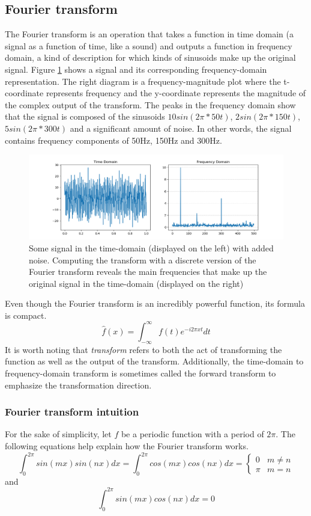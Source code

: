 \subsection{Fourier transform} 
The Fourier transform is an operation that takes a function in time domain (a signal as a function of time, like a sound) and outputs a function in frequency domain, a kind of description for which kinds of sinusoids make up the original signal. Figure \ref{fig:transform} shows a signal and its corresponding frequency-domain representation. The right diagram is a frequency-magnitude plot where the t-coordinate represents frequency and the y-coordinate represents the magnitude of the complex output of the transform. The peaks in the frequency domain show that the signal is composed of the sinusoids $10sin(2\pi * 50t)$, $2sin(2\pi * 150t)$, $5sin(2\pi * 300t)$ and a significant amount of noise. In other words, the signal contains frequency components of 50Hz, 150Hz and 300Hz. 

\begin{figure}[ht]
    \centering
    \includegraphics[width=\textwidth]{./images/transform.png}
    \caption{Some signal in the time-domain (displayed on the left) with added noise. Computing the transform with a discrete version of the Fourier transform reveals the main frequencies that make up the original signal in the time-domain (displayed on the right)\label{fig:transform}}
\end{figure}

Even though the Fourier transform is an incredibly powerful function, its formula is compact. 
$$\hat{f}(x) = \int_{-\infty}^{\infty} f(t)e^{-i2\pi x t} dt$$
It is worth noting that \textit{transform} refers to both the act of transforming the function as well as the output of the transform. Additionally, the time-domain to frequency-domain transform is sometimes called the forward transform to emphasize the transformation direction. 

\subsubsection{Fourier transform intuition}
For the sake of simplicity, let $f$ be a periodic function with a period of $2\pi$. The following equations help explain how the Fourier transform works.
\[ \int_0^{2\pi} sin(mx)sin(nx)dx = \int_0^{2\pi} cos(mx)cos(nx)dx= 
\begin{cases} %
    0 & m\neq n \\
    \pi & m=n
\end{cases} 
\]
\noindent and
$$\int_0^{2\pi} sin(mx)cos(nx)dx = 0$$


